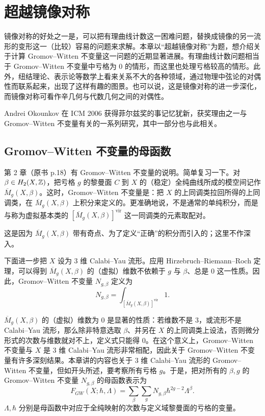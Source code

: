 \renewcommand{\thesection}{\arabic{section}}
\chapter{超越镜像对称}

镜像对称的好处之一是，可以把有理曲线计数这一困难问题，替换成镜像的另一流形的变形这一（比较）容易的问题来求解。本章以“超越镜像对称”为题，想介绍关于计算 Gromov--Witten 不变量这一问题的近期显著进展。有理曲线计数问题相当于 Gromov--Witten 不变量中亏格为 0 的情形，而这里也处理亏格较高的情形。此外，纽结理论、表示论等数学上看来关系不大的各种领域，通过物理中弦论的对偶性而联系起来，出现了这样有趣的图景。也可以说，这是镜像对称的进一步深化，而镜像对称可看作辛几何与代数几何之间的对偶性。

Andrei Okounkov 在 ICM 2006 获得菲尔兹奖的事记忆犹新，获奖理由之一与 Gromov--Witten 不变量有关的一系列研究，其中一部分也与此相关。

\section{Gromov--Witten 不变量的母函数}

第 2 章（原书 p.18）有 Gromov--Witten 不变量的说明。简单复习一下。对 $\beta\in H_{2}(X,\mathbb{Z})$，把亏格 $g$ 的黎曼面 $C$ 到 $X$ 的（稳定）全纯曲线所成的模空间记作 $\overline{M}_{g}(X,\beta)$。这时，Gromov--Witten 不变量是：把 $X$ 的上同调类拉回所得的上同调类，在 $\overline{M}_{g}(X,\beta)$ 上积分来定义的。更准确地说，不是通常的单纯积分，而是与称为虚拟基本类的 $[\overline{M}_{g}(X,\beta)]^{\mathrm{vir}}$ 这一同调类的元素取配对。

这是因为 $\overline{M}_{g}(X,\beta)$ 带有奇点、为了定义“正确”的积分而引入的；这里不作深入。

下面进一步把 $X$ 设为 3 维 Calabi--Yau 流形。应用 Hirzebruch--Riemann--Roch 定理，可以得到 $\overline{M}_{g}(X,\beta)$ 的（虚拟）维数不依赖于 $g$ 与 $\beta$、总是 0 这一性质。因此，Gromov--Witten 不变量 $N_{g,\beta}$ 定义为
\[ N_{g,\beta}=\int_{[\overline{M}_{g}(X,\beta)]^{\mathrm{vir}}}1. \]

$\overline{M}_{g}(X,\beta)$ 的（虚拟）维数为 0 是显著的性质：若维数不是 3，或流形不是 Calabi--Yau 流形，那么除非特意选取 $\beta$、并另在 $X$ 的上同调类上设法，否则微分形式的次数与维数就对不上，定义式只能得 0。在这个意义上，Gromov--Witten 不变量与 $X$ 是 3 维 Calabi--Yau 流形非常相配，因此关于 Gromov--Witten 不变量有许多深刻结果。本章讲的内容也关于 3 维 Calabi--Yau 流形的 Gromov--Witten 不变量，但如开头所述，要考察所有亏格 $g$。于是，把对所有的 $\beta,g$ 的 Gromov--Witten 不变量 $N_{g,\beta}$ 的母函数表示为
\[ F_{GW}(X;\hbar,\Lambda)=\sum_{\beta}\sum_{g}N_{g,\beta}\hbar^{2g-2}\Lambda^{\beta}. \tag{1} \]
$\Lambda,\hbar$ 分别是母函数中对应于全纯映射的次数与定义域黎曼面的亏格的变量。

